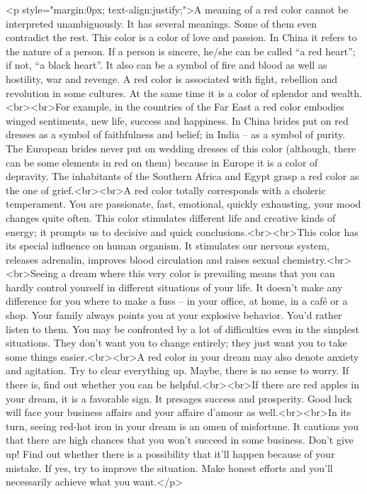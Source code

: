 		<p style="margin:0px; text-align:justify;">A meaning of a red color cannot be interpreted unambiguously. It has several meanings. Some of them even contradict the rest. This color is a color of love and passion. In China it refers to the nature of a person. If a person is sincere, he/she can be called “a red heart”; if not, “a black heart”. It also can be a symbol of fire and blood as well as hostility, war and revenge. A red color is associated with fight, rebellion and revolution in some cultures. At the same time it is a color of splendor and wealth.<br><br>For example, in the countries of the Far East a red color embodies winged sentiments, new life, success and happiness. In China brides put on red dresses as a symbol of faithfulness and belief; in India – as a symbol of purity. The European brides never put on wedding dresses of this color (although, there can be some elements in red on them) because in Europe it is a color of depravity. The inhabitants of the Southern Africa and Egypt grasp a red color as the one of grief.<br><br>A red color totally corresponds with a choleric temperament. You are passionate, fast, emotional, quickly exhausting, your mood changes quite often. This color stimulates different life and creative kinds of energy; it prompts us to decisive and quick conclusions.<br><br>This color has its special influence on human organism. It stimulates our nervous system, releases adrenalin, improves blood circulation and raises sexual chemistry.<br><br>Seeing a dream where this very color is prevailing means that you can hardly control yourself in different situations of your life. It doesn’t make any difference for you where to make a fuss – in your office, at home, in a café or a shop. Your family always points you at your explosive behavior. You’d rather listen to them. You may be confronted by a lot of difficulties even in the simplest situations. They don’t want you to change entirely; they just want you to take some things easier.<br><br>A red color in your dream may also denote anxiety and agitation. Try to clear everything up. Maybe, there is no sense to worry. If there is, find out whether you can be helpful.<br><br>If there are red apples in your dream, it is a favorable sign. It presages success and prosperity. Good luck will face your business affairs and your affaire d'amour as well.<br><br>In its turn, seeing red-hot iron in your dream is an omen of misfortune. It cautions you that there are high chances that you won’t succeed in some business. Don’t give up! Find out whether there is a possibility that it’ll happen because of your mistake. If yes, try to improve the situation. Make honest efforts and you’ll necessarily achieve what you want.</p>

